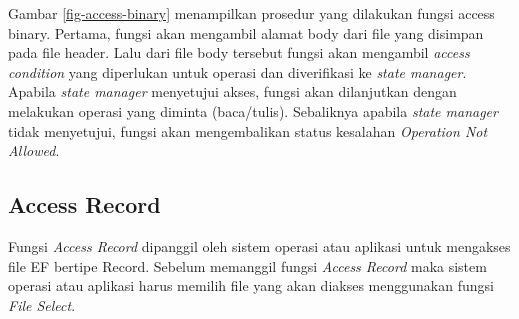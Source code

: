 \documentclass[a4paper, 12pt]{report}
\begin{document}
Gambar \ref{fig-access-binary} menampilkan prosedur yang dilakukan fungsi access binary. Pertama, fungsi akan mengambil alamat body dari file yang disimpan pada file header. Lalu dari file body tersebut fungsi akan mengambil {\em access condition} yang diperlukan untuk operasi dan diverifikasi ke {\em state manager}. Apabila {\em state manager} menyetujui akses, fungsi akan dilanjutkan dengan melakukan operasi yang diminta (baca/tulis). Sebaliknya apabila {\em state manager} tidak menyetujui, fungsi akan mengembalikan status kesalahan {\em Operation Not Allowed}.



\subsection{Access Record}

Fungsi {\em Access Record} dipanggil oleh sistem operasi atau aplikasi untuk mengakses file EF bertipe Record. Sebelum memanggil fungsi {\em Access Record} maka sistem operasi atau aplikasi harus memilih file yang akan diakses menggunakan fungsi {\em File Select}.
\end{document}
